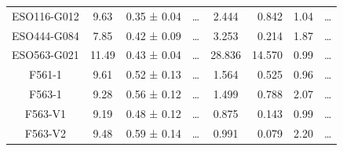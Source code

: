 \documentclass[reprint,%
 amsmath,amssymb,
 aps,
]{revtex4-1}
\begin{document}
\begin{table}[]
\begin{tabular}{cccccrrc}
\rowcolor[HTML]{F3F3F3} 
ESO116-G012          & 9.63                      & 0.35 ± 0.04           & …                      & 2.444                                                        & 0.842                                                        & 1.04                                                          & …                                                             \\
\rowcolor[HTML]{F3F3F3} 
ESO444-G084          & 7.85                      & 0.42 ± 0.09           & …                      & 3.253                                                        & 0.214                                                          & 1.87                                                           & …                                                             \\
\rowcolor[HTML]{F3F3F3} 
ESO563-G021          & 11.49                     & 0.43 ± 0.04           & …                      & 28.836                                                       & 14.570                                                          & 0.99                                                          & …                                                             \\
\rowcolor[HTML]{F3F3F3} 
F561-1               & 9.61                      & 0.52 ± 0.13           & …                      & 1.564                                                        & 0.525                                                          & 0.96                                                          & …                                                             \\
\rowcolor[HTML]{F3F3F3} 
F563-1               & 9.28                      & 0.56 ± 0.12           & …                      & 1.499                                                        & 0.788                                                         & 2.07                                                           & …                                                             \\
\rowcolor[HTML]{F3F3F3} 
F563-V1              & 9.19                      & 0.48 ± 0.12           & …                      & 0.875                                                        & 0.143                                                         & 0.99                                                           & …                                                             \\
\rowcolor[HTML]{F3F3F3} 
F563-V2              & 9.48                      & 0.59 ± 0.14           & …                      & 0.991                                                        & 0.079                                                       & 2.20                                                           & …                                                             \\

\end{tabular}
\end{table}
\end{document}
